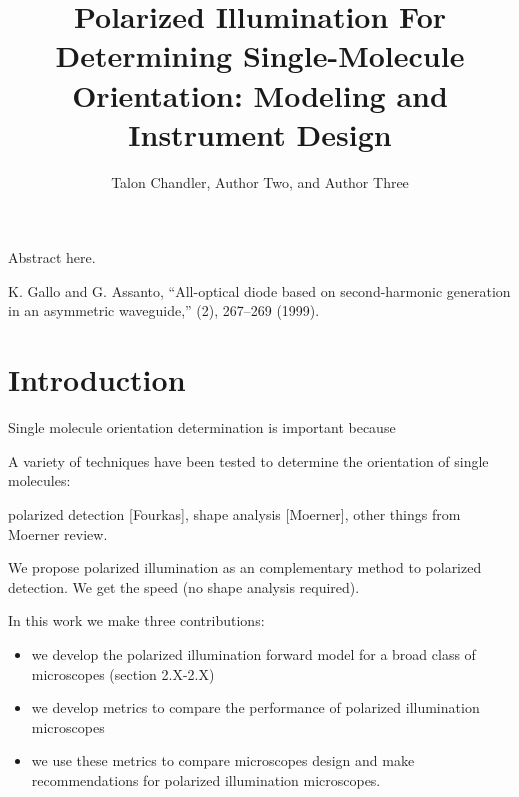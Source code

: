 \documentclass[10pt]{article}
\begin{document}
\title{Polarized Illumination For Determining Single-Molecule Orientation:
  Modeling and Instrument Design}

\author{Talon Chandler, Author Two, and Author Three}

\address{Peer Review, Publications Department, The Optical Society, 2010 Massachusetts Avenue NW, Washington, DC 20036, USA\\
Publications Department, The Optical Society, 2010 Massachusetts Avenue NW, Washington, DC 20036, USA\\
Currently with the Department of Electronic Journals, The Optical Society, 2010 Massachusetts Avenue NW, Washington, DC 20036, USA}


\begin{abstract*}
Abstract here. 
\end{abstract*}


\begin{thebibliography}{99}
 K. Gallo and G. Assanto, ``All-optical diode based on second-harmonic generation in an asymmetric waveguide,'' (2), 267--269 (1999).
\end{thebibliography}

\section{Introduction}
Single molecule orientation determination is important because

A variety of techniques have been tested to determine the orientation of
single molecules:

polarized detection [Fourkas], shape analysis [Moerner], other things from
Moerner review. 

We propose polarized illumination as an complementary method to polarized
detection. We get the speed (no shape analysis required).

In this work we make three contributions:
\begin{itemize}
\item we develop the polarized illumination forward model for a broad class of
  microscopes (section 2.X-2.X)
\item we develop metrics to compare the performance of polarized illumination
  microscopes 
\item we use these metrics to compare microscopes design and make recommendations
  for polarized illumination microscopes. 
\end{itemize}
\end{document}
